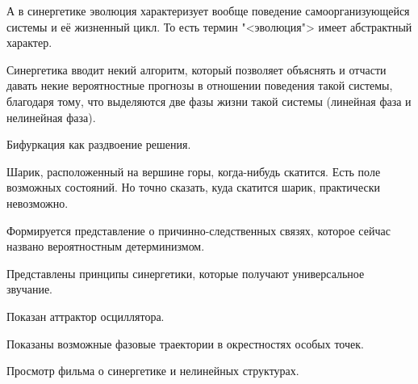 \documentclass[main.tex]{subfiles}
\begin{document}
А в синергетике эволюция характеризует вообще поведение самоорганизующейся системы и её жизненный цикл.
То есть термин "<эволюция"> имеет абстрактный характер.


Синергетика вводит некий алгоритм, который позволяет объяснять и отчасти давать некие вероятностные прогнозы в отношении поведения такой системы, благодаря тому, что выделяются две фазы жизни такой системы (линейная фаза и нелинейная фаза).

Бифуркация как раздвоение решения.

Шарик, расположенный на вершине горы, когда-нибудь скатится.
Есть поле возможных состояний.
Но точно сказать, куда скатится шарик, практически невозможно.

Формируется представление о причинно-следственных связях, которое сейчас названо вероятностным детерминизмом.



Представлены принципы синергетики, которые получают универсальное звучание.




Показан аттрактор осциллятора.

Показаны возможные фазовые траектории в окрестностях особых точек.




Просмотр фильма о синергетике и нелинейных структурах.
\end{document}
